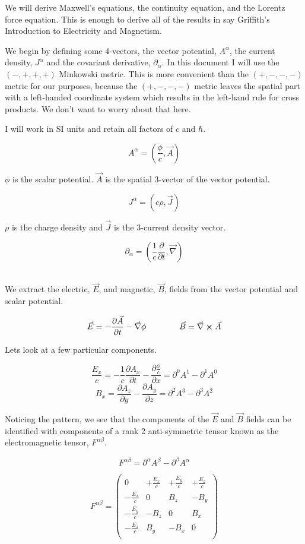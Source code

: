 \documentclass[12pt]{article}
\newcommand{\pardiv}[2][]{\frac{\partial #1}{\partial #2}}
\newcommand{\vecnab}{\vec{\nabla}}
\begin{document}
We will derive Maxwell's equations, the continuity equation, and the Lorentz force equation.
This is enough to derive all of the results in say Griffith's Introduction to Electricity and Magnetism.

We begin by defining some 4-vectors, the vector potential, $A^{\alpha}$, the current density, $J^{\alpha}$ and the covariant derivative, $\partial_{\alpha}$.
In this document I will use the $(-,+,+,+)$ Minkowski metric.
This is more convenient than the $(+,-,-,-)$ metric for our purposes, because the $(+,-,-,-)$ metric leaves the spatial part with a left-handed coordinate system which results in the left-hand rule for cross products.
We don't want to worry about that here.

I will work in SI units and retain all factors of $c$ and $\hbar$.

\[A^{\alpha} = \left(\frac{\phi}{c},\vec{A}\right)\]

$\phi$ is the scalar potential. $\vec{A}$ is the spatial 3-vector of the vector potential.

\[J^{\alpha} = (c \rho, \vec{J}) \]

$\rho$ is the charge density and $\vec{J}$ is the 3-current density vector.

\[ \partial_{\alpha} = \left(\frac{1}{c} \pardiv{t}, \vecnab\right)\] \

We extract the electric, $\vec{E}$, and magnetic, $\vec{B}$, fields from the vector potential and scalar potential.

\[\vec{E} = -\pardiv[\vec{A}]{t} - \vecnab \phi \qquad \qquad \vec{B} = \vecnab\cross \vec{A}\]

Lets look at a few particular components.

\[ \frac{E_x}{c} = -\frac{1}{c} \pardiv[A_x]{t} - \pardiv[\frac{\phi}{c}]{x} = \partial^0 A^1 - \partial^1 A^0 \]
\[ B_x = \pardiv[A_z]{y} - \pardiv[A_y]{z} = \partial^2 A^3 - \partial^3 A^2\]

Noticing the pattern, we see that the components of the $\vec{E}$ and $\vec{B}$ fields can be identified with components of a rank 2 anti-symmetric tensor known as the electromagnetic tensor, $F^{\alpha \beta}$.

\[F^{\alpha \beta} = \partial^{\alpha}A^{\beta} - \partial^{\beta}A^{\alpha} \]

\renewcommand{\arraystretch}{1.5}

\[F^{\alpha \beta} = 
\left(\begin{array}{cccc}
0 & +\frac{E_x}{c} & +\frac{E_y}{c} & +\frac{E_z}{c} \\
-\frac{E_x}{c} & 0 & B_z & -B_y \\
-\frac{E_y}{c} & -B_z & 0 & B_x \\
-\frac{E_z}{c} & B_y & -B_x & 0 \\
\end{array}\right)
\]
\end{document}
